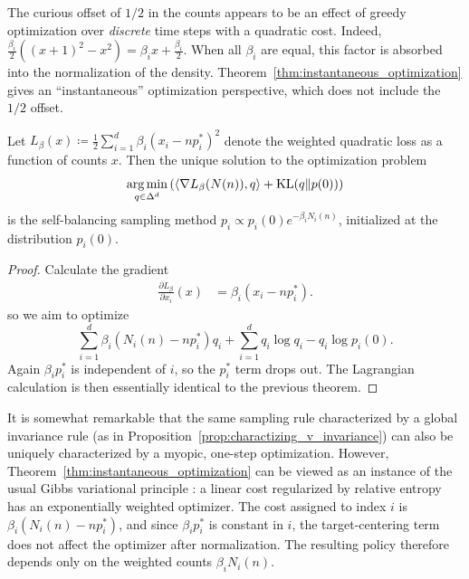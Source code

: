 The curious offset of $1/2$ in the counts appears to be an effect of greedy optimization 
over \emph{discrete} time steps with a quadratic cost. Indeed, 
$\frac{\beta_i}{2}((x+1)^2 - x^2) = \beta_i x + \frac{\beta_i}{2}$. When all $\beta_i$ are equal, 
this factor is absorbed into the normalization of the density. Theorem~\ref{thm:instantaneous_optimization} gives an ``instantaneous'' 
optimization perspective, which does not include the $1/2$ offset.

\begin{theorem} \label{thm:instantaneous_optimization}
    Let $L_\beta(x) \coloneqq \frac{1}{2} \sum_{i=1}^d \beta_i (x_i - n p_i^*)^2$ denote the weighted quadratic loss as a function of counts $x$. Then the unique solution to the optimization problem
    $$\operatorname*{arg\,min}_{q \in \Delta^d} \left(\langle \nabla L_\beta(N(n)),q \rangle + \operatorname{KL}(q \|p(0)) \right)$$
    is the self-balancing sampling method $p_i \propto p_i(0)e^{-\beta_i N_i(n)}$, initialized at the distribution $p_i(0)$.

\end{theorem}

\begin{proof}
    Calculate the gradient
    \begin{align*}
        \frac{\partial L_\beta}{\partial x_i}(x) &= \beta_i(x_i - n p_i^*).
    \end{align*}
    so we aim to optimize
    $$\sum_{i=1}^d \beta_i(N_i(n)-np_i^*)q_i + \sum_{i=1}^d q_i \log q_i - q_i \log p_i(0).$$
    Again $\beta_i p_i^*$ is independent of $i$, so the $p_i^*$ term drops out. The Lagrangian calculation
    is then essentially identical to the previous theorem.
\end{proof}

It is somewhat remarkable that the same sampling rule characterized by a global invariance rule 
(as in Proposition~\ref{prop:charactizing_v_invariance}) can also be uniquely characterized by a
 myopic, one-step optimization. However, Theorem~\ref{thm:instantaneous_optimization} can be viewed as an 
 instance of the usual Gibbs variational principle \cite{donsker1975_markov_process_expectations_large_time}: a 
 linear cost regularized by relative entropy has an exponentially weighted optimizer. The 
 cost assigned to index $i$ is $\beta_i (N_i(n) - np_i^*)$, and since $\beta_i p_i^*$ is constant in $i$, the 
 target-centering term does not affect the optimizer after normalization. The resulting policy therefore 
 depends only on the weighted counts $\beta_i N_i(n)$.


